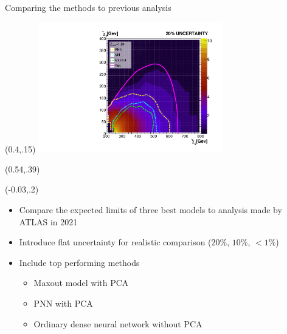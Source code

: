 \documentclass[UKenglish]{beamer}
\begin{document}
\begin{frame}{Comparing the methods to previous analysis}
    \begin{textblock}{1}(0.4,.15)
    \includegraphics[width=0.6\textwidth]{figures/Limits/compLimit20.pdf}
    \end{textblock}
    \begin{textblock}{1}(0.54,.39)
        \scriptsize
        \cite{atlas_search_2021}
    \end{textblock}
    \begin{textblock}{.45}(-0.03,.2)
    \begin{itemize}
        \item Compare the expected limits of three best models
              to analysis made by ATLAS in 2021 \cite{atlas_search_2021}
        \item Introduce flat uncertainty for realistic comparison ($20\%$, $10\%$, $<1\%$) 
        \item Include top performing methods
        \begin{itemize}
            \item Maxout model with PCA
            \item PNN with PCA
            \item Ordinary dense neural network without PCA
        \end{itemize}
    \end{itemize}
\end{textblock}
\end{frame}
\end{document}
